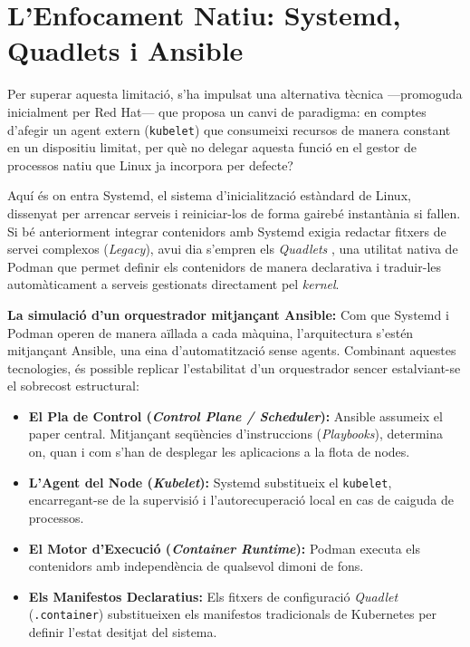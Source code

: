 \section{L'Enfocament Natiu: Systemd, Quadlets i Ansible}
Per superar aquesta limitació, s'ha impulsat una alternativa tècnica —promoguda inicialment per Red Hat— que proposa un canvi de paradigma: en comptes d'afegir un agent extern (\texttt{kubelet}) que consumeixi recursos de manera constant en un dispositiu limitat, per què no delegar aquesta funció en el gestor de processos natiu que Linux ja incorpora per defecte?  

Aquí és on entra Systemd, el sistema d'inicialització estàndard de Linux, dissenyat per arrencar serveis i reiniciar-los de forma gairebé instantània si fallen. Si bé anteriorment integrar contenidors amb Systemd exigia redactar fitxers de servei complexos (\textit{Legacy}), avui dia s'empren els \textit{Quadlets} \cite{podman_systemd_unit}, una utilitat nativa de Podman que permet definir els contenidors de manera declarativa i traduir-les automàticament a serveis gestionats directament pel \textit{kernel}.

\textbf{La simulació d'un orquestrador mitjançant Ansible:}
Com que Systemd i Podman operen de manera aïllada a cada màquina, l'arquitectura s'estén mitjançant Ansible, una eina d'automatització sense agents. Combinant aquestes tecnologies, és possible replicar l'estabilitat d'un orquestrador sencer estalviant-se el sobrecost estructural:

\begin{itemize}
    \item \textbf{El Pla de Control (\textit{Control Plane / Scheduler}):} Ansible assumeix el paper central. Mitjançant seqüències d'instruccions (\textit{Playbooks}), determina on, quan i com s'han de desplegar les aplicacions a la flota de nodes.
    \item \textbf{L'Agent del Node (\textit{Kubelet}):} Systemd substitueix el \texttt{kubelet}, encarregant-se de la supervisió i l'autorecuperació local en cas de caiguda de processos.
    \item \textbf{El Motor d'Execució (\textit{Container Runtime}):} Podman executa els contenidors amb independència de qualsevol dimoni de fons.
    \item \textbf{Els Manifestos Declaratius:} Els fitxers de configuració \textit{Quadlet} (\texttt{.container}) substitueixen els manifestos tradicionals de Kubernetes per definir l'estat desitjat del sistema.
\end{itemize}

